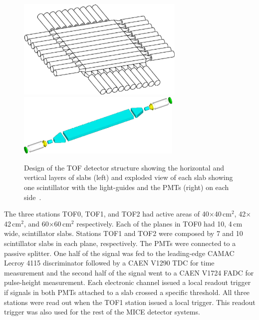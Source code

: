 
\begin{figure}[!ht]
  \centering
  \includegraphics[width=8cm]{tof_diagram2}
  \includegraphics[height=3cm]{slab_design2}
  \caption{Design of the TOF detector structure showing the horizontal and vertical layers of slabs (left) and exploded view of each slab showing one scintillator with the light-guides and the PMTs (right) on each side~\cite{NOTE145}.}
  \label{fig:tof:schematic}
\end{figure}

The three stations TOF0, TOF1, and TOF2 had active areas of
40$\times$40\,cm$^2$, 42$\times$42\,cm$^2$, and 60$\times$60\,cm$^2$
respectively.  Each of the planes in TOF0 had 10, 4\,cm wide, scintillator slabs.
Stations TOF1 and TOF2 were composed by 7 and 10 scintillator slabs in each plane, respectively.
The PMTs were connected to a passive splitter.
One half of the signal was fed to the leading-edge CAMAC Lecroy 4115 discriminator followed by a CAEN
V1290 TDC for time measurement and the second half of the signal went to a CAEN V1724 FADC for pulse-height measurement.
Each electronic channel issued a local readout trigger if signals in both PMTs attached to a
slab crossed a specific threshold. All three stations were read out when the TOF1 station issued a local trigger.
This readout trigger was also used for the rest of the MICE detector systems.


